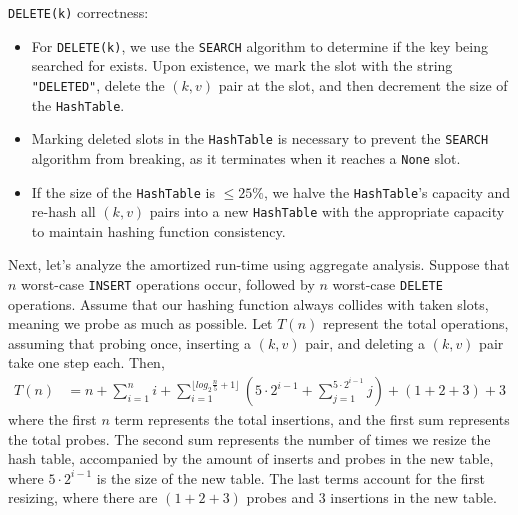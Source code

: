 \documentclass{article}
\begin{document}
\verb|DELETE(k)| correctness:
\begin{itemize}
    \item For \verb|DELETE(k)|, we use the \verb|SEARCH| algorithm to determine if the key being searched for exists. Upon existence, we mark the slot with the string \verb|"DELETED"|, delete the $(k, v)$ pair at the slot, and then decrement the size of the \verb|HashTable|. 
    \item Marking deleted slots in the \verb|HashTable| is necessary to prevent the \verb|SEARCH| algorithm from breaking, as it terminates when it reaches a \verb|None| slot.
    \item If the size of the \verb|HashTable| is $\leq25\%$, we halve the \verb|HashTable|'s capacity and re-hash all $(k, v)$ pairs into a new \verb|HashTable| with the appropriate capacity to maintain hashing function consistency.
\end{itemize}

\noindent Next, let's analyze the amortized run-time using aggregate analysis. Suppose that $n$ worst-case \verb|INSERT| operations occur, followed by $n$ worst-case \verb|DELETE| operations. Assume that our hashing function always collides with taken slots, meaning we probe as much as possible. Let $T(n)$ represent the total operations, assuming that probing once, inserting a $(k, v)$ pair, and deleting a $(k, v)$ pair take one step each. Then,
\begin{align*}
    T(n) &= n + \sum_{i=1}^{n}{i} + \sum_{i=1}^{\lfloor{log_{2}{\tfrac{n}{5}} + 1\rfloor}}({5\cdot{2^{i-1}}} + \sum_{j=1}^{5\cdot{2^{i-1}}}{j}) + (1 + 2 + 3) + 3 
\end{align*}
where the first $n$ term represents the total insertions, and the first sum represents the total probes. The second sum represents the number of times we resize the hash table, accompanied by the amount of inserts and probes in the new table, where $5\cdot{2^{i-1}}$ is the size of the new table. The last terms account for the first resizing, where there are $(1 + 2 + 3)$ probes and $3$ insertions in the new table.\\ \\ 
\end{document}
